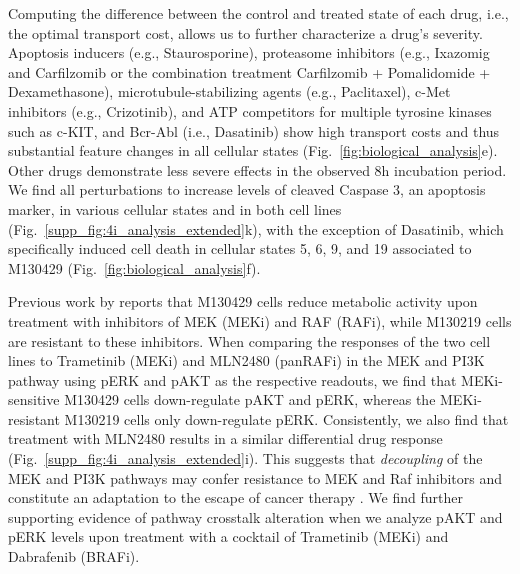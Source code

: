  Computing the difference between the control and treated state of each drug, i.e., the optimal
transport cost, allows us to further characterize a drug's severity. 
Apoptosis inducers (e.g., Staurosporine), proteasome inhibitors (e.g., Ixazomig and Carfilzomib or the combination treatment Carfilzomib + Pomalidomide + Dexamethasone), microtubule-stabilizing agents (e.g., Paclitaxel), c-Met inhibitors (e.g., Crizotinib), and ATP competitors for multiple tyrosine kinases such as c-KIT, and Bcr-Abl (i.e., Dasatinib) show high transport costs and thus substantial feature changes in all cellular states (Fig.~\ref{fig:biological_analysis}e). Other drugs demonstrate less severe effects in the observed 8h incubation period. 
We find all perturbations to increase levels of cleaved Caspase 3, an apoptosis marker, in various cellular states and in both cell lines (Fig.~\ref{supp_fig:4i_analysis_extended}k), with the exception of Dasatinib, which specifically induced cell death in cellular states 5, 6, 9, and 19 associated to M130429 (Fig.~\ref{fig:biological_analysis}f).


 Previous work by \citet{smith2016inhibiting} reports that M130429 cells reduce metabolic activity %
upon treatment with inhibitors of MEK (MEKi) and RAF (RAFi), while M130219 cells are resistant to these inhibitors. When comparing the responses of the two cell lines to Trametinib (MEKi) and MLN2480 (panRAFi) in the MEK and PI3K pathway using pERK and pAKT as the respective readouts, we find that MEKi-sensitive M130429 cells down-regulate pAKT and pERK, whereas the MEKi-resistant M130219 cells only down-regulate pERK. Consistently, we also find that treatment with MLN2480 results in a similar differential drug response (Fig.~\ref{supp_fig:4i_analysis_extended}i). This suggests that \textit{decoupling} of the MEK and PI3K pathways may confer resistance to MEK and Raf inhibitors and constitute an adaptation to the escape of cancer therapy \citep{kun2021mek}. We find further supporting evidence of pathway crosstalk alteration when we analyze pAKT and pERK levels upon treatment with a cocktail of Trametinib (MEKi) and Dabrafenib (BRAFi). 

